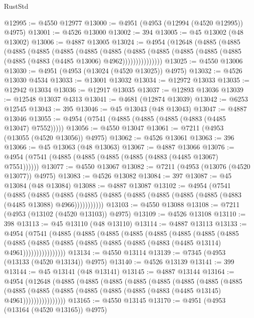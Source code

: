 \begin{lexlean}{RustStd}
\begin{coremodule}
@12995 := @4550 @12977
@13000 := @4951 (@4953 (@12994 (@4520 @12995)) @4975)
@13001 := @4526 @13000
@13002 := 394
@13005 := @45 @13002 (@48 @13002)
@13006 := @4887 @13005
@13024 := @4954
    (@12648
      (@4885
        (@4885
          (@4885
            (@4885
              (@4885
                (@4885
                  (@4885
                    (@4885
                      (@4885 (@4885 (@4885 (@4885 (@4885 (@4883 (@4485 @13006) @4962)))))))))))))))
@13025 := @4550 @13006
@13030 := @4951 (@4953 (@13024 (@4520 @13025)) @4975)
@13032 := @4526 @13030 @4534
@13033 := @13001 @13032
@13034 := @12972 @13033
@13035 := @12942 @13034
@13036 := @12917 @13035
@13037 := @12893 @13036
@13039 := @12548 @13037 @4313
@13041 := @4681 (@12874 @13039)
@13042 := @6253 @12545
@13043 := 395
@13046 := @45 @13043 (@48 @13043)
@13047 := @4887 @13046
@13055 := @4954 (@7541 (@4885 (@4885 (@4885 (@4883 (@4485 @13047) @7552)))))
@13056 := @4550 @13047
@13061 := @7211 (@4953 (@13055 (@4520 @13056)) @4975)
@13062 := @4526 @13061
@13063 := 396
@13066 := @45 @13063 (@48 @13063)
@13067 := @4887 @13066
@13076 := @4954 (@7541 (@4885 (@4885 (@4885 (@4885 (@4883 (@4485 @13067) @7551))))))
@13077 := @4550 @13067
@13082 := @7211 (@4953 (@13076 (@4520 @13077)) @4975)
@13083 := @4526 @13082
@13084 := 397
@13087 := @45 @13084 (@48 @13084)
@13088 := @4887 @13087
@13102 := @4954
    (@7541
      (@4885
        (@4885
          (@4885 (@4885 (@4885 (@4885 (@4885 (@4885 (@4885 (@4883 (@4485 @13088) @4966)))))))))))
@13103 := @4550 @13088
@13108 := @7211 (@4953 (@13102 (@4520 @13103)) @4975)
@13109 := @4526 @13108
@13110 := 398
@13113 := @45 @13110 (@48 @13110)
@13114 := @4887 @13113
@13133 := @4954
    (@7541
      (@4885
        (@4885
          (@4885
            (@4885
              (@4885
                (@4885
                  (@4885
                    (@4885
                      (@4885
                        (@4885
                          (@4885 (@4885 (@4885 (@4885 (@4883 (@4485 @13114) @4961))))))))))))))))
@13134 := @4550 @13114
@13139 := @7345 (@4953 (@13133 (@4520 @13134)) @4975)
@13140 := @4526 @13139
@13141 := 399
@13144 := @45 @13141 (@48 @13141)
@13145 := @4887 @13144
@13164 := @4954
    (@12648
      (@4885
        (@4885
          (@4885
            (@4885
              (@4885
                (@4885
                  (@4885
                    (@4885
                      (@4885
                        (@4885
                          (@4885 (@4885 (@4885 (@4885 (@4883 (@4485 @13145) @4961))))))))))))))))
@13165 := @4550 @13145
@13170 := @4951 (@4953 (@13164 (@4520 @13165)) @4975)

\end{coremodule}
\end{lexlean}
